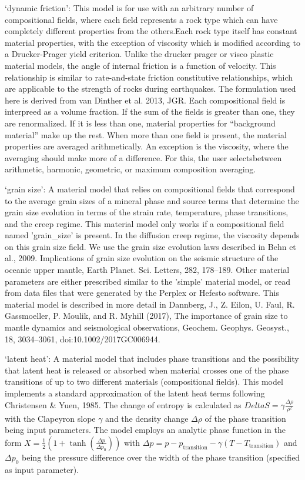 \begin{itemize}
`dynamic friction': This model is for use with an arbitrary number of compositional fields, where each field represents a rock type which can have completely different properties from the others.Each rock type itself has constant material properties, with the exception of viscosity which is modified according to a Drucker-Prager yield criterion. Unlike the drucker prager or visco plastic material models, the angle of internal friction is a function of velocity. This relationship is similar to rate-and-state friction constitutive relationships, which are applicable to the strength of rocks during earthquakes. The formulation used here is derived from van Dinther et al. 2013, JGR. Each compositional field is interpreed as a volume fraction. If the sum of the fields is greater than one, they are renormalized. If it is less than one, material properties for ``background material'' make up the rest. When more than one field is present, the material properties are averaged arithmetically. An exception is the viscosity, where the averaging should make more of a difference. For this, the user selectsbetween arithmetic, harmonic, geometric, or maximum composition averaging. 

`grain size': A material model that relies on compositional fields that correspond to the average grain sizes of a mineral phase and source terms that determine the grain size evolution in terms of the strain rate, temperature, phase transitions, and the creep regime. This material model only works if a compositional field named 'grain_size' is present. In the diffusion creep regime, the viscosity depends on this grain size field. We use the grain size evolution laws described in Behn et al., 2009. Implications of grain size evolution on the seismic structure of the oceanic upper mantle, Earth Planet. Sci. Letters, 282, 178–189. Other material parameters are either prescribed similar to the 'simple' material model, or read from data files that were generated by the Perplex or Hefesto software. This material model is described in more detail in Dannberg, J., Z. Eilon, U. Faul, R. Gassmoeller, P. Moulik, and R. Myhill (2017), The importance of grain size to mantle dynamics and seismological observations, Geochem. Geophys. Geosyst., 18, 3034–3061, doi:10.1002/2017GC006944.

`latent heat': A material model that includes phase transitions and the possibility that latent heat is released or absorbed when material crosses one of the phase transitions of up to two different materials (compositional fields). This model implements a standard approximation of the latent heat terms following Christensen \& Yuen, 1985. The change of entropy is calculated as $Delta S = \gamma \frac{\Delta\rho}{\rho^2}$ with the Clapeyron slope $\gamma$ and the density change $\Delta\rho$ of the phase transition being input parameters. The model employs an analytic phase function in the form $X=\frac{1}{2} \left( 1 + \tanh \left( \frac{\Delta p}{\Delta p_0} \right) \right)$ with $\Delta p = p - p_{\text{transition}} - \gamma \left( T - T_{\text{transition}} \right)$ and $\Delta p_0$ being the pressure difference over the width of the phase transition (specified as input parameter).


\end{itemize}
